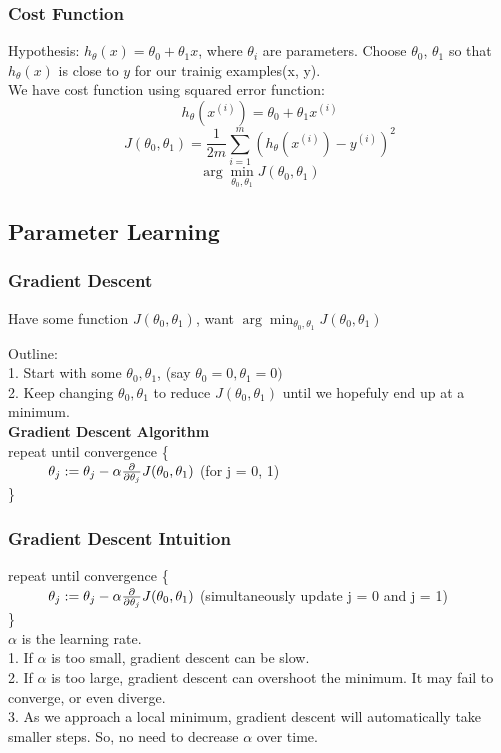 \documentclass{article}
\newcommand\tab[1][1cm]{\hspace*{#1}}
\begin{document}
\subsubsection{Cost Function}
Hypothesis: $h_\theta(x) = \theta_0 + \theta_1 x$, where $\theta_i$ are parameters.
Choose $\theta_0$, $\theta_1$ so that $h_\theta(x)$ is close to $y$ for our trainig examples(x, y). \\

We have cost function using squared error function: 
$$h_\theta(x^{(i)}) = \theta_0 + \theta_1 x^{(i)}$$
$$J(\theta_0, \theta_1) = \frac{1}{2m} \sum_{i=1}^{m}(h_\theta(x^{(i)}) - y^{(i)})^2$$
$$\arg\min_{\theta_0, \theta_1}J(\theta_0, \theta_1) $$

\subsection{Parameter Learning}
\subsubsection{Gradient Descent}
Have some function $J(\theta_0, \theta_1)$, want $\arg\min_{\theta_0, \theta_1}J(\theta_0, \theta_1)$

Outline: \\

1. Start with some $\theta_0, \theta_1$, (say $\theta_0 = 0, \theta_1 = 0)$ \\
2. Keep changing $\theta_0, \theta_1$ to reduce $J(\theta_0, \theta_1)$ until we hopefuly end up at a minimum. \\

\textbf{Gradient Descent Algorithm}\\
repeat until convergence \{\\
$\tab \theta_j := \theta_j - \alpha \frac{\partial}{\partial \theta_j}J(\theta_0, \theta_1) $ (for j = 0, 1)\\
\}

\subsubsection{Gradient Descent Intuition}
repeat until convergence \{\\
$\tab \theta_j := \theta_j - \alpha \frac{\partial}{\partial \theta_j}J(\theta_0, \theta_1) $ (simultaneously update j = 0 and j = 1)\\
\}\\

$\alpha$ is the learning rate. \\
1. If $\alpha$ is too small, gradient descent can be slow. \\
2. If $\alpha$ is too large, gradient descent can overshoot the minimum. It may fail to converge, or even diverge. \\
3. As we approach a local minimum, gradient descent will automatically take smaller steps. So, no need to decrease $\alpha$ over time. \\
\end{document}

